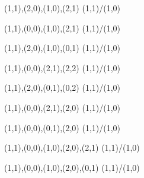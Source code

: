 \documentclass[preview,border={0pt 0pt 0pt 0pt},convert={density=300,outext=.png}]{standalone}
\begin{document}
\begin{figure}
\begin{subfigure}[b]{0.15\textwidth}
{       {{(1,1),(2,0),(1,0),(2,1)}}       {{{(1,1)/(1,0)}}}
    }
    \caption{}
  \end{subfigure}
  \begin{subfigure}[b]{0.15\textwidth}
    \resizebox{\linewidth}{!} {
       {{(1,1),(0,0),(1,0),(2,1)}}       {{{(1,1)/(1,0)}}}
    }
    \caption{}
  \end{subfigure}
  \begin{subfigure}[b]{0.15\textwidth}
    \resizebox{\linewidth}{!} {
       {{(1,1),(2,0),(1,0),(0,1)}}       {{{(1,1)/(1,0)}}}
    }
    \caption{}
  \end{subfigure}
  \begin{subfigure}[b]{0.15\textwidth}
    \resizebox{\linewidth}{!} {
       {{(1,1),(0,0),(2,1),(2,2)}}       {{{(1,1)/(1,0)}}}
    }
    \caption{}
  \end{subfigure}
  \begin{subfigure}[b]{0.15\textwidth}
    \resizebox{\linewidth}{!} {
       {{(1,1),(2,0),(0,1),(0,2)}}       {{{(1,1)/(1,0)}}}
    }
    \caption{}
  \end{subfigure}
  \begin{subfigure}[b]{0.15\textwidth}
    \resizebox{\linewidth}{!} {
       {{(1,1),(0,0),(2,1),(2,0)}}       {{{(1,1)/(1,0)}}}
    }
    \caption{}
  \end{subfigure}
  \begin{subfigure}[b]{0.15\textwidth}
    \resizebox{\linewidth}{!} {
       {{(1,1),(0,0),(0,1),(2,0)}}       {{{(1,1)/(1,0)}}}
    }
    \caption{}
  \end{subfigure}
  \begin{subfigure}[b]{0.15\textwidth}
    \resizebox{\linewidth}{!} {
       {{(1,1),(0,0),(1,0),(2,0),(2,1)}} {{{(1,1)/(1,0)}}}
    }
    \caption{}
  \end{subfigure}
  \begin{subfigure}[b]{0.15\textwidth}
    \resizebox{\linewidth}{!} {
       {{(1,1),(0,0),(1,0),(2,0),(0,1)}} {{{(1,1)/(1,0)}}}
    }
    \caption{}
  \end{subfigure}
\end{figure}
\end{document}
